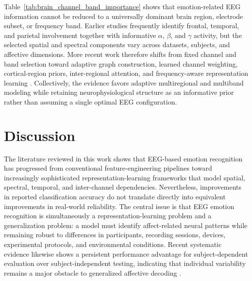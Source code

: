 \documentclass{WileyMSP-template}
\begin{document}
Table~\ref{tab:brain_channel_band_importance} shows that emotion-related EEG information cannot be reduced to a universally dominant brain region, electrode subset, or frequency band. Earlier studies frequently identify frontal, temporal, and parietal involvement together with informative $\alpha$, $\beta$, and $\gamma$ activity, but the selected spatial and spectral components vary across datasets, subjects, and affective dimensions. More recent work therefore shifts from fixed channel and band selection toward adaptive graph construction, learned channel weighting, cortical-region priors, inter-regional attention, and frequency-aware representation learning \cite{brcfi_yang2024,brcfi_valderrama2025,brcfi_lin2025brkds,brcfi_xu2026uacl}. Collectively, the evidence favors adaptive multiregional and multiband modeling while retaining neurophysiological structure as an informative prior rather than assuming a single optimal EEG configuration.

\section{Discussion}
\label{sec:discussion}

The literature reviewed in this work shows that EEG-based emotion recognition has progressed from conventional feature-engineering pipelines toward increasingly sophisticated representation-learning frameworks that model spatial, spectral, temporal, and inter-channel dependencies. Nevertheless, improvements in reported classification accuracy do not translate directly into equivalent improvements in real-world reliability. The central issue is that EEG emotion recognition is simultaneously a representation-learning problem and a generalization problem: a model must identify affect-related neural patterns while remaining robust to differences in participants, recording sessions, devices, experimental protocols, and environmental conditions. Recent systematic evidence likewise shows a persistent performance advantage for subject-dependent evaluation over subject-independent testing, indicating that individual variability remains a major obstacle to generalized affective decoding \cite{khare2024systematicemotionai,prabowo2023eegslr}.
\end{document}
